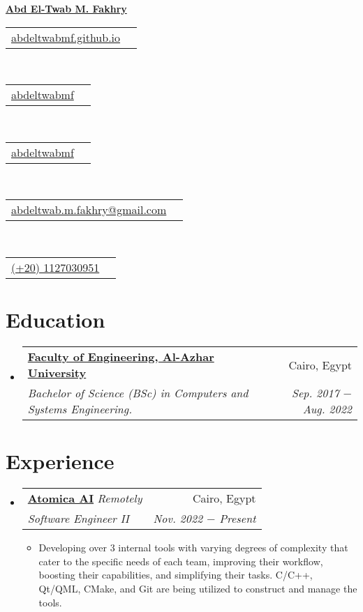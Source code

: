 \documentclass[letterpaper, 11pt]{article}
\makeatletter
\newcommand{\education}[6] {
	\vspace{-1pt}\item[]
  \begin{tabular*}{1\textwidth}[t]{l@{\extracolsep{\fill}}r}
		#1 \href{#2}{\textbf{\color{RoyalBlue}#3}} & #4 \\
    \textit{\small #5} & \textit{\small #6} \\
  \end{tabular*}
  \vspace{-4pt}
}
\newcommand{\experience}[7] {
	\vspace{-1pt}\item[]
  \begin{tabular*}{1\textwidth}[t]{l@{\extracolsep{\fill}}r}
		#1 \href{#2}{\textbf{\color{RoyalBlue}#3}}
		\textbar{} \textit{\footnotesize#4} & #5 \\
		\textit{\small #6} & \textit{\small #7} \\
  \end{tabular*}
  \vspace{-8pt}
}
\newcommand{\subexperience}[1] {
\item\small
  {#1}
  \vspace{-2pt}
}
\newcommand{\name}[2] {
  \textbf{
    \href{#1}{\Huge{#2}}
  }
  \vspace{-4pt}
}
\newcommand{\contact}[4] {
  \begin{tabular}{lr}
    {\href{#1}{\color{#3} #2 #4}}
  \end{tabular}
  \vspace{-4pt}
}
\makeatother
\begin{document}
\name{https://abdeltwabmf.github.io}{Abd El-Twab M. Fakhry}

\begin{center}
  \small
  \contact
  {https://abdeltwabmf.github.io}
  {\faIcon{globe}}{RoyalBlue}{abdeltwabmf.github.io}\,
  \contact
  {https://www.linkedin.com/in/abdeltwabmf}
  {\faIcon{linkedin}}{RoyalBlue}{abdeltwabmf}\,
  \contact
  {https://github.com/AbdeltwabMF}
  {\faIcon{github}}{RoyalBlue}{abdeltwabmf}\,
  \contact
  {mailto:abdeltwab.m.fakhry@gmail.com}
  {\faIcon{envelope}}{RoyalBlue}{abdeltwab.m.fakhry@gmail.com}\,
  \contact
  {tel:+201127030951}
  {\faIcon{mobile-alt}}{RoyalBlue}{(+20) 1127030951}
\end{center}\vspace{8pt}

\section{Education}
\begin{itemize}[leftmargin=0pt]
  \education
  {\faIcon{university}}
	{https://eng-azhar.net/}
  {Faculty of Engineering, Al-Azhar University}{ Cairo, Egypt}
  {Bachelor of Science (BSc) in Computers and Systems Engineering.}{Sep. 2017 $-$ Aug. 2022}
\end{itemize}

\section{Experience}
\begin{itemize}[leftmargin=0pt]
  \experience
	{\faIcon{briefcase}}
	{https://atomica.ai/}{Atomica AI}{Remotely}{Cairo, Egypt}
  {Software Engineer II}{Nov. 2022 $-$ Present}

  \begin{itemize}
    \subexperience
		{Developing over 3 internal tools with varying degrees of complexity that cater to the specific needs of each team, improving their workflow, boosting their capabilities, and simplifying their tasks. C/C++, Qt/QML, CMake, and Git are being utilized to construct and manage the tools.}
  \end{itemize}\vspace{-4pt}
\end{itemize}

\end{document}
